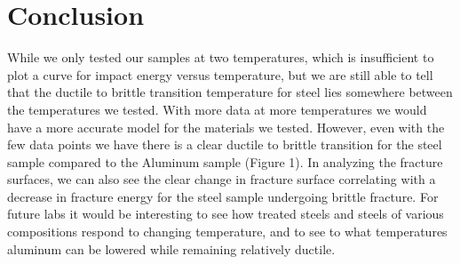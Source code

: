 \documentclass{article}
\begin{document}
\section{Conclusion}
While we only tested our samples at two temperatures, which is insufficient to plot a curve for impact energy versus temperature, but we are still able to tell that the ductile to brittle transition temperature for steel lies somewhere between the temperatures we tested. With more data at more temperatures we would have a more accurate model for the materials we tested. However, even with the few data points we have there is a clear ductile to brittle transition for the steel sample compared to the Aluminum sample (Figure 1). In analyzing the fracture surfaces, we can also see the clear change in fracture surface correlating with a decrease in fracture energy for the steel sample undergoing brittle fracture. For future labs it would be interesting to see how treated steels and steels of various compositions respond to changing temperature, and to see to what temperatures aluminum can be lowered while remaining relatively ductile.
\end{document}
